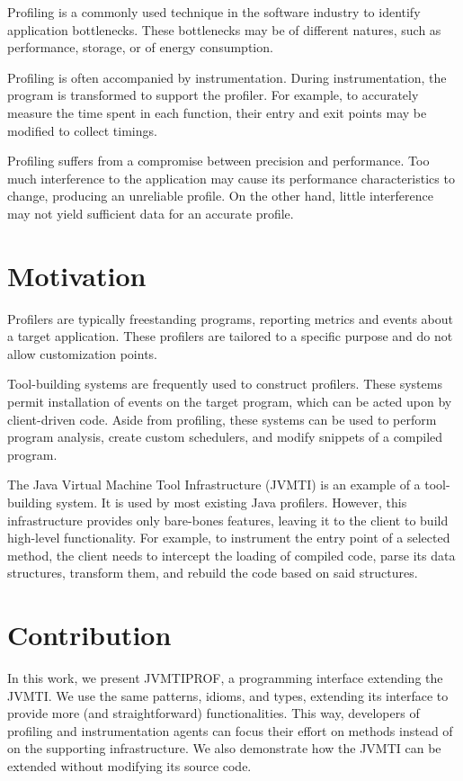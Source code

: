 \label{cap:introduction}

Profiling is a commonly used technique in the software industry to identify application bottlenecks. These bottlenecks may be of different natures, such as performance, storage, or of energy consumption.

Profiling is often accompanied by instrumentation. During instrumentation, the program is transformed to support the profiler. For example, to accurately measure the time spent in each function, their entry and exit points may be modified to collect timings.

Profiling suffers from a compromise between precision and performance. Too much interference to the application may cause its performance characteristics to change, producing an unreliable profile. On the other hand, little interference may not yield sufficient data for an accurate profile.

\section{Motivation}

Profilers are typically freestanding programs, reporting metrics and events about a target application. These profilers are tailored to a specific purpose and do not allow customization points.

Tool-building systems are frequently used to construct profilers. These systems permit installation of events on the target program, which can be acted upon by client-driven code. Aside from profiling, these systems can be used to perform program analysis, create custom schedulers, and modify snippets of a compiled program.

The Java Virtual Machine Tool Infrastructure (JVMTI) is an example of a tool-building system. It is used by most existing Java profilers. However, this infrastructure provides only bare-bones features, leaving it to the client to build high-level functionality. For example, to instrument the entry point of a selected method, the client needs to intercept the loading of compiled code, parse its data structures, transform them, and rebuild the code based on said structures.

\section{Contribution}

In this work, we present JVMTIPROF, a programming interface extending the JVMTI. We use the same patterns, idioms, and types, extending its interface to provide more (and straightforward) functionalities. This way, developers of profiling and instrumentation agents can focus their effort on methods instead of on the supporting infrastructure. We also demonstrate how the JVMTI can be extended without modifying its source code.

